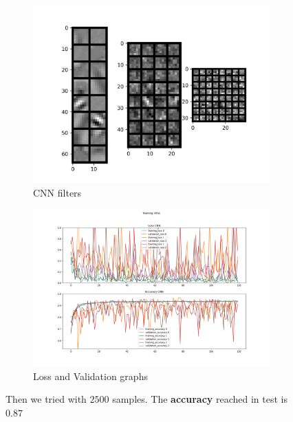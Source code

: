 \documentclass{report}
\begin{document}
\begin{figure}[t!]
  \centering
  \hspace{-2cm}
  \begin{subfigure}[t]{0.49\textwidth}
    \centering
    \includegraphics[width=1.3\textwidth]{4.CNN_2500_sample/CNN_filters.png}
    \caption{CNN filters}
    \label{fig:image-set2-sub1}
  \end{subfigure}
  \hspace{-0.5cm}
  \begin{subfigure}[t]{0.49\textwidth}
    \centering
    \includegraphics[width=1.3\textwidth]{4.CNN_2500_sample/training_infos.png}
    \caption{Loss and Validation graphs}
    \label{fig:image-set2-sub2}
  \end{subfigure}

  \caption{Then we tried with $2500$ samples. The \textbf{accuracy} reached in test is $0.87$
  }
  \label{fig:image-set2}
\end{figure}
\end{document}

